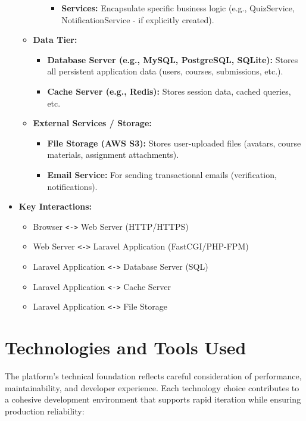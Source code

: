 \documentclass[12pt,a4paper]{article}
\begin{document}
\begin{itemize}
\begin{itemize}
\begin{itemize}
\begin{itemize}
                \item \textbf{Services:} Encapsulate specific business logic (e.g., QuizService, NotificationService - if explicitly created).
            \end{itemize}
        \end{itemize}
        \item \textbf{Data Tier:}
        \begin{itemize}
            \item \textbf{Database Server (e.g., MySQL, PostgreSQL, SQLite):} Stores all persistent application data (users, courses, submissions, etc.).
            \item \textbf{Cache Server (e.g., Redis):} Stores session data, cached queries, etc.
        \end{itemize}
        \item \textbf{External Services / Storage:}
        \begin{itemize}
            \item \textbf{File Storage (AWS S3):} Stores user-uploaded files (avatars, course materials, assignment attachments).
            \item \textbf{Email Service:} For sending transactional emails (verification, notifications).
        \end{itemize}
    \end{itemize}
    \item \textbf{Key Interactions:}
    \begin{itemize}
        \item Browser \texttt{<->} Web Server (HTTP/HTTPS)
        \item Web Server \texttt{<->} Laravel Application (FastCGI/PHP-FPM)
        \item Laravel Application \texttt{<->} Database Server (SQL)
        \item Laravel Application \texttt{<->} Cache Server
        \item Laravel Application \texttt{<->} File Storage
    \end{itemize}
\end{itemize}
\clearpage


\section{Technologies and Tools Used}
\label{sec:technologies-tools}

The platform's technical foundation reflects careful consideration of performance, maintainability, and developer experience. Each technology choice contributes to a cohesive development environment that supports rapid iteration while ensuring production reliability:
\end{document}
